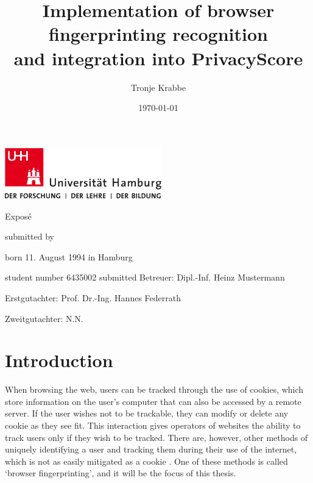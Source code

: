 \documentclass[
    fontsize=12pt,
    headings=small,
    parskip=half,
    bibliography=totoc,
    numbers=noenddot,
    open=any
    ]{scrreprt}
\title{
    \large Implementation of browser fingerprinting recognition \\
    and integration into PrivacyScore
}
\author{Tronje Krabbe}
\date{\today}
\begin{document}
\hypersetup{hidelinks}


\newpage
\thispagestyle{empty}
\begin{titlepage}%
\includegraphics[width=6.8cm]{../images/up-uhh-logo-u-2010-u-farbe-u-rgb.pdf}
\begin{center}\Large
    \vfill
    Exposé
	\vfill
	\makeatletter
	{\Large\textsf{\textbf{\@title}}\par}
	\makeatother
	\vfill
    submitted by
	\par\bigskip
	\makeatletter
	{\@author} \par
	\makeatother
	born 11. August 1994 in Hamburg \par
	student number 6435002
	\vfill
	\makeatletter
	submitted {\@date}
	\makeatother
	\vfill
	Betreuer: Dipl.-Inf. Heinz Mustermann \par
	Erstgutachter: Prof. Dr.-Ing. Hannes Federrath \par
	Zweitgutachter: N.N.
\end{center}
\end{titlepage}%

\tableofcontents

\chapter{Introduction} %

When browsing the web, users can be tracked through the use of cookies, which store information on the user's computer
that can also be accessed by a remote server.
If the user wishes not to be trackable, they can modify or delete any cookie as they see fit. This interaction gives
operators of websites the ability to track users only if they wish to be tracked.
There are, however, other methods of uniquely identifying a user and tracking them during their use of the internet,
which is not as easily mitigated as a cookie \cite{am_i_unique}. One of these methods is called `browser fingerprinting',
and it will be the focus of this thesis.
\end{document}
